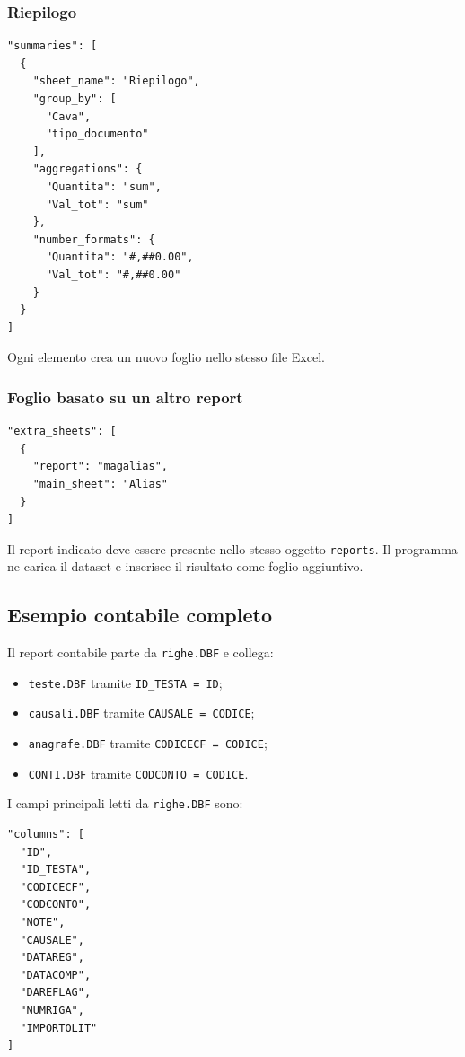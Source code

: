 \subsubsection{Riepilogo}

\begin{lstlisting}
"summaries": [
  {
    "sheet_name": "Riepilogo",
    "group_by": [
      "Cava",
      "tipo_documento"
    ],
    "aggregations": {
      "Quantita": "sum",
      "Val_tot": "sum"
    },
    "number_formats": {
      "Quantita": "#,##0.00",
      "Val_tot": "#,##0.00"
    }
  }
]
\end{lstlisting}

Ogni elemento crea un nuovo foglio nello stesso file Excel.

\subsubsection{Foglio basato su un altro report}

\begin{lstlisting}
"extra_sheets": [
  {
    "report": "magalias",
    "main_sheet": "Alias"
  }
]
\end{lstlisting}

Il report indicato deve essere presente nello stesso oggetto
\texttt{reports}. Il programma ne carica il dataset e inserisce il risultato
come foglio aggiuntivo.

\subsection{Esempio contabile completo}

Il report contabile parte da \texttt{righe.DBF} e collega:

\begin{itemize}
  \item \texttt{teste.DBF} tramite \texttt{ID\_TESTA = ID};
  \item \texttt{causali.DBF} tramite \texttt{CAUSALE = CODICE};
  \item \texttt{anagrafe.DBF} tramite \texttt{CODICECF = CODICE};
  \item \texttt{CONTI.DBF} tramite \texttt{CODCONTO = CODICE}.
\end{itemize}

I campi principali letti da \texttt{righe.DBF} sono:

\begin{lstlisting}
"columns": [
  "ID",
  "ID_TESTA",
  "CODICECF",
  "CODCONTO",
  "NOTE",
  "CAUSALE",
  "DATAREG",
  "DATACOMP",
  "DAREFLAG",
  "NUMRIGA",
  "IMPORTOLIT"
]
\end{lstlisting}

